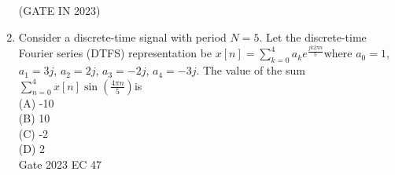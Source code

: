 \begin{enumerate}[label=\thechapter.\arabic*,ref=\thechapter.\theenumi]
\hfill{(GATE IN 2023)}\\
\solution
\pagebreak
\item Consider a discrete-time signal with period $N=5$. Let the discrete-time Fourier series (DTFS) representation be $ x[n] = \sum\limits_{k=0}^{4} a_k e^{\frac{jk2\pi n}{5}} $where $a_0=1$, $a_1=3j$, $a_2=2j$, $a_3=-2j$, $a_4=-3j$. The value of the sum $\sum\limits_{n=0}^{4}x[n] \sin\left(\frac{4\pi n}{5}\right) $is\\
(A) -10\\
(B) 10\\
(C) -2\\
(D) 2\\
\hfill Gate 2023 EC 47
\solution
\pagebreak
\end{enumerate}
